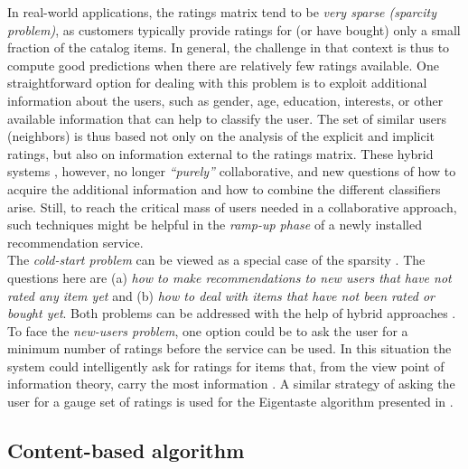 In real-world applications, the ratings matrix tend to be \textit{very
sparse (sparcity problem)}, as customers typically provide  ratings
for (or have bought) only a small fraction of the catalog items. In
general, the challenge in that context is thus to compute good
predictions when there are relatively few ratings available. One
straightforward option for dealing with this problem is to exploit
additional information about the users, such as gender, age,
education, interests, or other available information that can help to
classify the user. The set of similar users (neighbors) is thus based
not only on the analysis of the explicit and implicit ratings, but
also on information external to the ratings matrix. These hybrid
systems \cite{pazzani2007content}, however, no longer
\textit{“purely”} collaborative, and new questions of how to acquire
the additional information and how to combine the different
classifiers arise. Still, to reach the critical mass of users needed
in a collaborative approach, such techniques might be helpful in the
\textit{ramp-up phase} of a newly installed recommendation service. \\
The \textit{cold-start problem} can be viewed as a special case of the
sparsity \cite{huang2004applying}. The questions here are (a)
\textit{how to make recommendations to new users that have not rated
any item yet} and (b) \textit{how to deal with items that have not
been rated or bought yet}. Both problems can be addressed with the
help of hybrid approaches \cite{adomavicius2005toward}.  To face the
\textit{new-users problem}, one option could be to ask the user for a
minimum number of ratings before the service can be used. In this
situation the system could intelligently ask for ratings for items
that, from the view point of information theory, carry the most
information  \cite{rashid2002getting}. A similar strategy of asking
the user for a gauge set of ratings is used for the Eigentaste
algorithm presented in  \cite{goldberg2001eigentaste}.

\subsection{Content-based algorithm}

